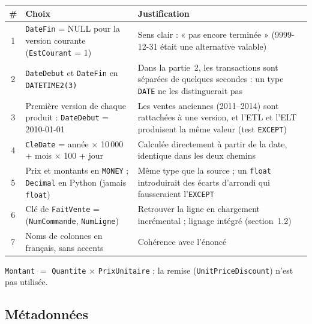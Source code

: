 \documentclass[10pt,a4paper]{article}
\begin{document}
\begingroup\small
\begin{tabularx}{\textwidth}{@{}c>{\raggedright\arraybackslash}p{5.2cm}X@{}}
\toprule
\# & Choix & Justification \\
\midrule
1 & \texttt{DateFin} = NULL pour la version courante (\texttt{EstCourant} = 1) & Sens clair : « pas encore terminée » (9999-12-31 était une alternative valable) \\
2 & \texttt{DateDebut} et \texttt{DateFin} en \texttt{DATETIME2(3)} & Dans la partie~2, les transactions sont séparées de quelques secondes : un type \texttt{DATE} ne les distinguerait pas \\
3 & Première version de chaque produit : \texttt{DateDebut} = 2010-01-01 & Les ventes anciennes (2011--2014) sont rattachées à une version, et l'ETL et l'ELT produisent la même valeur (test \texttt{EXCEPT}) \\
4 & \texttt{CleDate} = année $\times$ 10\,000 + mois $\times$ 100 + jour & Calculée directement à partir de la date, identique dans les deux chemins \\
5 & Prix et montants en \texttt{MONEY} ; \texttt{Decimal} en Python (jamais \texttt{float}) & Même type que la source ; un \texttt{float} introduirait des écarts d'arrondi qui fausseraient l'\texttt{EXCEPT} \\
6 & Clé de \texttt{FaitVente} = (\texttt{NumCommande}, \texttt{NumLigne}) & Retrouver la ligne en chargement incrémental ; lignage intégré (section~1.2) \\
7 & Noms de colonnes en français, sans accents & Cohérence avec l'énoncé \\
\bottomrule
\end{tabularx}
\endgroup

\texttt{Montant} $=$ \texttt{Quantite} $\times$ \texttt{PrixUnitaire} ; la remise (\texttt{UnitPriceDiscount}) n'est pas utilisée.

\subsection{Métadonnées}
\end{document}
